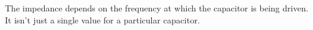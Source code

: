 The impedance depends on the frequency at which the capacitor is being
driven. It isn't just a single value for a particular capacitor.



